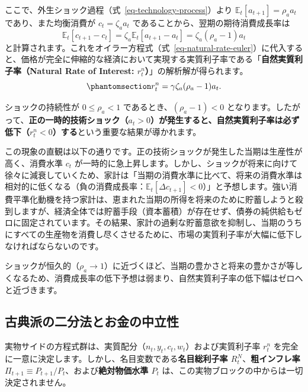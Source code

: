 \documentclass[
  japanese,
  lualatex,
  ja=standard,
  12pt,
  a4paper]{ltjsarticle}
\begin{document}
ここで、外生ショック過程（式~\ref{eq-technology-process}）より
\(\mathbb{E}_t[a_{t+1}] = \rho_a a_t\) であり、また均衡消費が
\(c_t = \zeta_a a_t\) であることから、翌期の期待消費成長率は \[
\mathbb{E}_t [c_{t+1} - c_t] = \zeta_a \mathbb{E}_t [a_{t+1} - a_t] = \zeta_a (\rho_a - 1) a_t
\]
と計算されます。これをオイラー方程式（式~\ref{eq-natural-rate-euler}）に代入すると、価格が完全に伸縮的な経済において実現する実質利子率である「\textbf{自然実質利子率（Natural
Rate of Interest: \(r_t^n\)）}」の解析解が得られます。
\begin{equation}\protect\phantomsection\label{eq-natural-rate-technology}{
r_t^n = \gamma \zeta_a (\rho_a - 1) a_t.
}\end{equation}

ショックの持続性が \(0 \leq \rho_a < 1\)
であるとき、\((\rho_a - 1) < 0\)
となります。したがって、\textbf{正の一時的技術ショック（\(a_t > 0\)）が発生すると、自然実質利子率は必ず低下（\(r_t^n < 0\)）する}という重要な結果が導かれます。

この現象の直観は以下の通りです。正の技術ショックが発生した当期は生産性が高く、消費水準
\(c_t\)
が一時的に急上昇します。しかし、ショックが将来に向けて徐々に減衰していくため、家計は「当期の消費水準に比べて、将来の消費水準は相対的に低くなる（負の消費成長率：\(\mathbb{E}_t[\Delta c_{t+1}] < 0\)）」と予想します。強い消費平準化動機を持つ家計は、恵まれた当期の所得を将来のために貯蓄しようと殺到しますが、経済全体では貯蓄手段（資本蓄積）が存在せず、債券の純供給もゼロに固定されています。その結果、家計の過剰な貯蓄意欲を抑制し、当期のうちにすべての生産物を消費し尽くさせるために、市場の実質利子率が大幅に低下しなければならないのです。

ショックが恒久的（\(\rho_a \to 1\)）に近づくほど、当期の豊かさと将来の豊かさが等しくなるため、消費成長率の低下予想は弱まり、自然実質利子率の低下幅はゼロへと近づきます。

\subsection{古典派の二分法とお金の中立性}\label{ux53e4ux5178ux6d3eux306eux4e8cux5206ux6cd5ux3068ux304aux91d1ux306eux4e2dux7acbux6027}

実物サイドの方程式群は、実質配分（\(n_t, y_t, c_t, w_t\)）および実質利子率
\(r_t^n\)
を完全に一意に決定します。しかし、名目変数である\textbf{名目総利子率
\(R_t^N\)}、\textbf{粗インフレ率
\(\Pi_{t+1} \equiv P_{t+1}/P_t\)}、および\textbf{絶対物価水準 \(P_t\)}
は、この実物ブロックの中からは一切決定されません。
\end{document}
